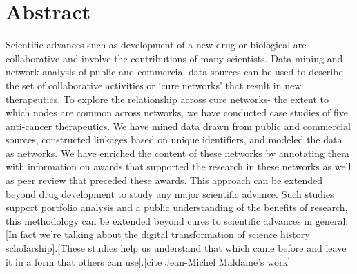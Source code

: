\documentclass[10pt,letterpaper]{article}
\begin{document}
\section*{Abstract}

Scientific advances such as development of a new drug or biological are collaborative and involve the contributions of many scientists.  Data mining and network analysis of public and commercial data sources can be used to describe the set of collaborative activities or `cure networks' that result in new therapeutics. To explore the relationship across cure networks- the extent to which nodes are common across networks, we have conducted case studies of five anti-cancer therapeutics. We have mined data drawn from public and commercial sources, constructed linkages based on unique identifiers, and modeled the data as networks. We have enriched the content of these networks by annotating them with information on awards that supported the research in these networks as well as peer review that preceded these awards. This approach can be extended beyond drug development to study any major scientific advance. Such studies support portfolio analysis and a public understanding of the benefits of research, this methodology can be extended beyond cures to scientific advances in general. [In fact we're talking about the digital transformation of science history scholarship].[These studies help us understand that which came before and leave it in a form that others can use].[cite Jean-Michel Maldame's work]


\linenumbers

\end{document}
